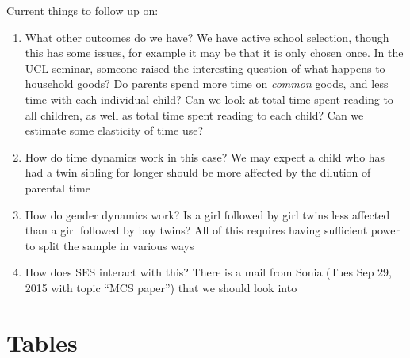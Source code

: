\documentclass[a4paper, 11pt]{article}
\theoremstyle{plain}
\begin{document}
Current things to follow up on:
\begin{enumerate}
\item What other outcomes do we have?  We have active school selection, though this has some issues, for example it may be that it is only chosen once.  In the UCL seminar, someone raised the interesting question of what happens to household goods?  Do parents spend more time on \emph{common} goods, and less time with each individual child?  Can we look at total time spent reading to all children, as well as total time spent reading to each child?  Can we estimate some elasticity of time use?
\item How do time dynamics work in this case?  We may expect a child who has had a twin sibling for longer should be more affected by the dilution of parental time
\item How do gender dynamics work?  Is a girl followed by girl twins less affected than a girl followed by boy twins?  All of this requires having sufficient power to split the sample in various ways
\item How does SES interact with this?  There is a mail from Sonia (Tues Sep 29, 2015 with topic ``MCS paper'') that we should look into
\end{enumerate}

\clearpage

\section{Tables}


\begin{landscape}

\end{landscape}



\begin{landscape}

\end{landscape}

\clearpage

\end{document}
